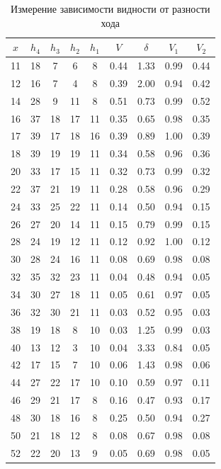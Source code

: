 \documentclass[a4paper,12pt]{article} %
\begin{document}
\begin{table}[h!]
	\caption{Измерение зависимости видности от разности хода}
	\begin{center}
		\begin{tabular}{|c|c|c|c|c|c|c|c|c|}
			\hline
			$ 	x  $ & $ h_4 $ &  $ h_3 $& $ h_2 $ & $ h_1 $ & $ V $ & $  \delta  $ & $ V_1 $ & $ V_2 $ \\
			\hline
			11 & 18 & 7  & 6  & 8  & 0.44 & 1.33 & 0.99 & 0.44 \\
			12 & 16 & 7  & 4  & 8  & 0.39 & 2.00 & 0.94 & 0.42 \\
			14 & 28 & 9  & 11 & 8  & 0.51 & 0.73 & 0.99 & 0.52 \\
			16 & 37 & 18 & 17 & 11 & 0.35 & 0.65 & 0.98 & 0.35 \\
			17 & 39 & 17 & 18 & 16 & 0.39 & 0.89 & 1.00 & 0.39 \\
			18 & 39 & 19 & 19 & 11 & 0.34 & 0.58 & 0.96 & 0.36 \\
			20 & 33 & 17 & 15 & 11 & 0.32 & 0.73 & 0.99 & 0.32 \\
			22 & 37 & 21 & 19 & 11 & 0.28 & 0.58 & 0.96 & 0.29 \\
			24 & 33 & 25 & 22 & 11 & 0.14 & 0.50 & 0.94 & 0.15 \\
			26 & 27 & 20 & 14 & 11 & 0.15 & 0.79 & 0.99 & 0.15 \\
			28 & 24 & 19 & 12 & 11 & 0.12 & 0.92 & 1.00 & 0.12 \\
			30 & 28 & 24 & 16 & 11 & 0.08 & 0.69 & 0.98 & 0.08 \\
			32 & 35 & 32 & 23 & 11 & 0.04 & 0.48 & 0.94 & 0.05 \\
			34 & 30 & 27 & 18 & 11 & 0.05 & 0.61 & 0.97 & 0.05 \\
			36 & 32 & 30 & 21 & 11 & 0.03 & 0.52 & 0.95 & 0.03 \\
			38 & 19 & 18 & 8  & 10 & 0.03 & 1.25 & 0.99 & 0.03 \\
			40 & 13 & 12 & 3  & 10 & 0.04 & 3.33 & 0.84 & 0.05 \\
			42 & 17 & 15 & 7  & 10 & 0.06 & 1.43 & 0.98 & 0.06 \\
			44 & 27 & 22 & 17 & 10 & 0.10 & 0.59 & 0.97 & 0.11 \\
			46 & 29 & 21 & 17 & 8  & 0.16 & 0.47 & 0.93 & 0.17 \\
			48 & 30 & 18 & 16 & 8  & 0.25 & 0.50 & 0.94 & 0.27 \\
			50 & 21 & 18 & 12 & 8  & 0.08 & 0.67 & 0.98 & 0.08 \\
			52 & 22 & 20 & 13 & 9  & 0.05 & 0.69 & 0.98 & 0.05 \\

\end{tabular}
\end{center}
\end{table}
\end{document}
